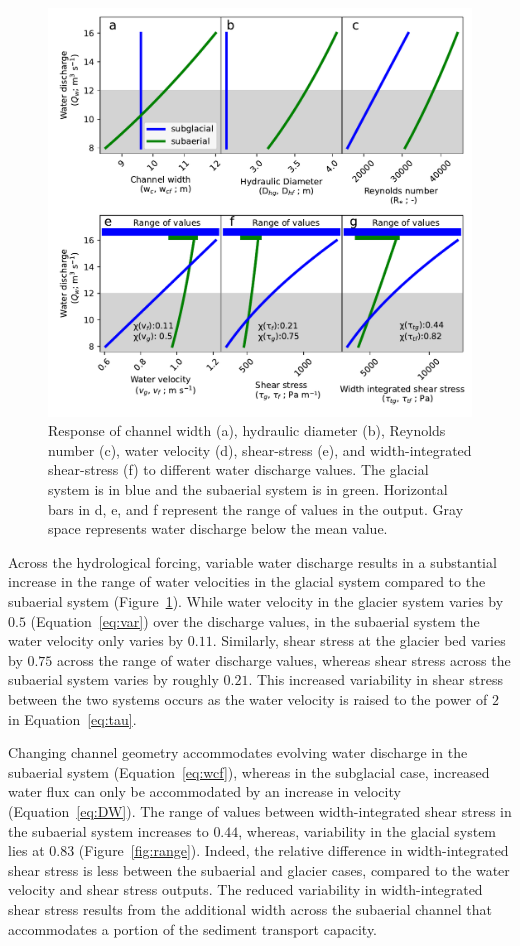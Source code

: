 \documentclass[11pt]{article}
\begin{document}
\begin{spacing}{1}
  \begin{center}
    \begin{figure}[H]
      \includegraphics[width=0.7\linewidth]{model_outputs.pdf}
      \caption{Response of channel width (a), hydraulic diameter (b),  Reynolds number  (c),  water velocity (d), shear-stress (e), and width-integrated shear-stress (f)  to different water discharge values. The glacial system is in blue and the subaerial system is in green.  Horizontal bars in d, e, and f represent the range of values in the  output. Gray space represents water discharge below the mean value. }
      \label{fig:model_outs}
    \end{figure}
  \end{center}
  
  Across the hydrological forcing, variable water discharge results in a substantial increase in the range of water velocities in the glacial system compared to the subaerial system (Figure~\ref{fig:model_outs}).
  While water velocity in the glacier system varies by  $0.5$ (Equation~\ref{eq:var}) over the discharge values, in the subaerial system the water velocity only varies by $0.11$.
  Similarly, shear stress at the glacier bed varies by $0.75$ across the range of water discharge values, whereas shear stress across the subaerial system varies by roughly $0.21$. This increased variability  in shear stress between the two systems occurs as the water velocity is raised to the power of $2$ in Equation~\ref{eq:tau}. 
  
  Changing channel geometry accommodates evolving water discharge in the subaerial system (Equation~\ref{eq:wcf}), whereas in the subglacial case, increased water flux can only be accommodated by an increase in velocity (Equation~\ref{eq:DW}).
  The range of values between width-integrated shear stress in the subaerial system increases to $0.44$, whereas, variability in the glacial system lies at $0.83$ (Figure~\ref{fig:range}).
  Indeed, the relative  difference in width-integrated shear stress is less between the subaerial and glacier cases, compared to the water velocity and shear stress outputs.
  The reduced variability in width-integrated shear stress results from the additional width across the subaerial channel that accommodates a portion of the sediment transport capacity.
  

\end{spacing}
\end{document}
